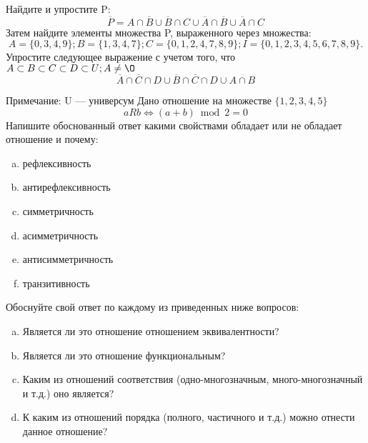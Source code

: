 \documentclass[10pt]{exam}
\begin{document}
\begin{questions}
\question
Найдите и упростите P:
\begin{equation*}
\overline{P} = A \cap \overline{B} \cup \overline{B} \cap C \cup \overline{A} \cap \overline{B} \cup \overline{A} \cap C
\end{equation*}
Затем найдите элементы множества P, выраженного через множества:
\begin{equation*}
A = \{0, 3, 4, 9\}; 
B = \{1, 3, 4, 7\};
C = \{0, 1, 2, 4, 7, 8, 9\};
I = \{0, 1, 2, 3, 4, 5, 6, 7, 8, 9\}.
\end{equation*}\question
Упростите следующее выражение с учетом того, что $A\subset B \subset C \subset D \subset U; A \neq \O$
\begin{equation*}
\overline{A} \cap \overline{C} \cap D \cup \overline{B} \cap \overline{C} \cap D \cup A \cap B
\end{equation*}

Примечание: U — универсум\question
Дано отношение на множестве $\{1, 2, 3, 4, 5\}$ 
\begin{equation*}
aRb \iff (a+b) \bmod 2 =0
\end{equation*}
Напишите обоснованный ответ какими свойствами обладает или не обладает отношение и почему:   
\begin{enumerate} [a)]\setcounter{enumi}{0}
\item рефлексивность
\item антирефлексивность
\item симметричность
\item асимметричность
\item антисимметричность
\item транзитивность
\end{enumerate}

Обоснуйте свой ответ по каждому из приведенных ниже вопросов:
\begin{enumerate} [a)]\setcounter{enumi}{0}
    \item Является ли это отношение отношением эквивалентности?
    \item Является ли это отношение функциональным?
    \item Каким из отношений соответствия (одно-многозначным, много-многозначный и т.д.) оно является?
    \item К каким из отношений порядка (полного, частичного и т.д.) можно отнести данное отношение?
\end{enumerate}




\end{questions}
\end{document}

